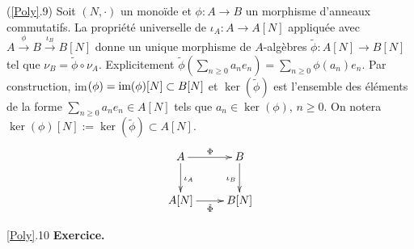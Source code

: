  
 
 
 

 
  (\ref{Poly}.9)  Soit $(N,\cdot)$ un monoïde et $\phi: A\rightarrow B$ un morphisme d'anneaux commutatifs. La propriété universelle de $\iota_A:A\rightarrow A[N]$ appliquée avec $A\stackrel{\phi}{\rightarrow} B\stackrel{\iota_B}{\rightarrow} B[N]$ donne un unique morphisme de $A$-algèbres $\tilde{\phi}:A[N]\rightarrow B[N]$ tel que $\nu_B=\tilde{\phi}\circ \nu_A$. Explicitement $\tilde{\phi}(\sum_{n\geq 0}a_ne_n)=\sum_{n\geq 0}\phi(a_n)e_n$.  Par construction, im$(\phi)=\hbox{\rm im}(\phi)[N]\subset B[N]$ et $\ker(\tilde{\phi})$ est l'ensemble des éléments de la forme $\sum_{n\geq 0}a_ne_n\in A[N]$ tels que $a_n\in \ker(\phi)$, $n\geq 0$. On notera $\ker(\phi)[N]:=\ker(\tilde{\phi})\subset A[N]$.\\

	$$ \xymatrix{ A\ar[r]^\Phi \ar[d]^{\iota_A} & B \ar[d]_{\iota_B} \\ A[N]\ar[r]_{\tilde{\Phi} } & B[N] } $$
 
 \ref{Poly}.10 \textbf{Exercice.} \\
 
